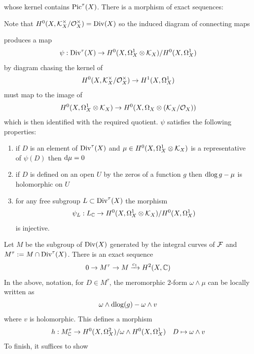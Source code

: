 \documentclass[main.tex]{subfiles}
\begin{document}
whose kernel contains $\operatorname{\mathrm{Pic}}^{\tau}(X)$. There is a morphism of exact sequences:
\begin{center}
\end{center}
Note that $H^0(X, \mathcal{K}_X^\times / \mathcal{O}_{X}^\times) = \operatorname{\mathrm{Div}}(X)$ so the induced diagram of connecting maps
\begin{center}
\end{center}
produces a map
\[ \psi : \operatorname{\mathrm{Div}}^{\tau}(X) \to H^0(X, \Omega_X^1 \otimes \mathcal{K}_X) / H^0(X, \Omega_X^1) \]
by diagram chasing the kernel of
\[ H^0(X, \mathcal{K}_X^\times / \mathcal{O}_{X}^\times) \to H^1(X, \Omega_X^1) \]
must map to the image of
\[ H^0(X, \Omega_X^1 \otimes \mathcal{K}_X) \to H^0(X, \Omega_X \otimes (\mathcal{K}_X / \mathcal{O}_{X})) \]
which is then identified with the required quotient. $\psi$ satisfies the following properties:
\begin{enumerate}
\item if $D$ is an element of $\operatorname{\mathrm{Div}}^{\tau}(X)$ and $\mu \in H^0(X, \Omega_X^1 \otimes \mathcal{K}_X)$ is a representative of $\psi(D)$ then $\mathrm{d}{\mu} = 0$
\item if $D$ is defined on an open $U$ by the zeros of a function $g$ then $\mathrm{d}{\log{g}} - \mu$ is holomorphic on $U$
\item for any free subgroup $L \subset \operatorname{\mathrm{Div}}^{\tau}(X)$ the morphism
\[ \psi_L : L_{\mathbb{C}} \to H^0(X, \Omega_X^1 \otimes \mathcal{K}_X) / H^0(X, \Omega_X^1) \]
is injective.
\end{enumerate}

Let $M$ be the subgroup of $\operatorname{\mathrm{Div}}(X)$ generated by the integral curves of $\mathcal{F}$ and $M^{\tau} := M \cap \operatorname{\mathrm{Div}}^{\tau}(X)$. There is an exact sequence
\[ 0 \to M^{\tau} \to M \xrightarrow{c_1} H^2(X, \mathbb{C}) \]
In the above, notation, for $D \in M^{\tau}$, the meromorphic $2$-form $\omega \wedge \mu$ can be locally written as
\[ \omega \wedge \mathrm{d}{\log}(g) - \omega \wedge v \]
where $v$ is holomorphic. This defines a morphism
\[ h : M^{\tau}_{\mathbb{C}} \to H^0(X, \Omega_X^2) / \omega \wedge H^0(X, \Omega_X^1) \quad D \mapsto \omega \wedge v \]
To finish, it suffices to show
\end{document}
